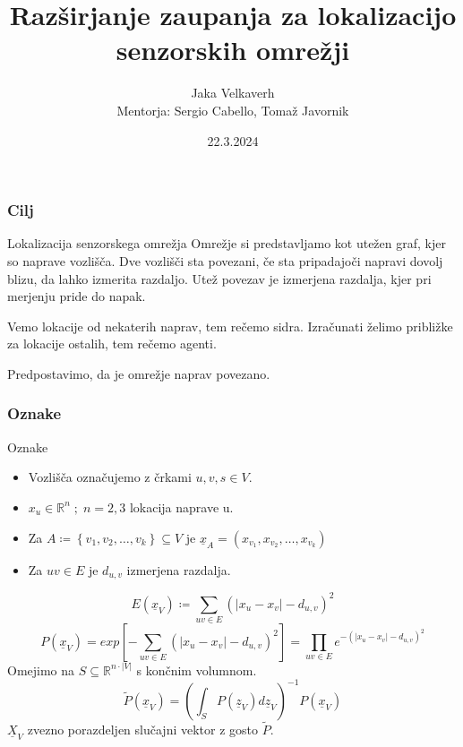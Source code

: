 \documentclass{beamer}
\title[Razširjanje zaupanja]{Razširjanje zaupanja za lokalizacijo senzorskih omrežji}
\author[Jaka Velkaverh]{Jaka Velkaverh\\Mentorja: Sergio Cabello, Tomaž Javornik}
\date{22.3.2024}
\renewcommand{\vec}{\underline}
\theoremstyle{definition}
\begin{document}
	\frame{\titlepage}

	\begin{frame}
		\frametitle{Cilj}
		\begin{block}{Lokalizacija senzorskega omrežja}
			Omrežje si predstavljamo kot utežen graf, kjer so naprave vozlišča.
			Dve vozlišči sta povezani, če sta pripadajoči napravi dovolj blizu,
			da lahko izmerita razdaljo. Utež povezav je izmerjena razdalja,
			kjer pri merjenju pride do napak.

			Vemo lokacije od nekaterih naprav, tem rečemo sidra. Izračunati
			želimo približke za lokacije ostalih, tem rečemo agenti.
		\end{block}
		Predpostavimo, da je omrežje naprav povezano.
	\end{frame}

	\begin{frame}
		\frametitle{Oznake}
		Oznake
		\begin{itemize}
			\item Vozlišča označujemo z črkami $u, v, s \in V$.
			\item $x_u \in \mathbb{R}^n\;;\;n=2, 3$ lokacija naprave u.
			\item Za $A \coloneqq \left\{v_1, v_2, \ldots, v_k\right\} \subseteq V$ je
				$\vec{x}_A = \left(x_{v_1}, x_{v_2}, \ldots, x_{v_k}\right)$
			\item Za $uv \in E$ je $d_{u,v}$ izmerjena razdalja.
		\end{itemize}
	\end{frame}

	\begin{frame}
		$$E\left(\vec{x}_V\right) \coloneqq \sum_{uv \in E}\left(\left|x_u - x_v\right|-d_{u,v}\right)^2$$
		\pause
		$$P\left(\vec{x}_V\right) = exp\left[-\sum_{uv \in E}\left(\left|x_u - x_v\right|-d_{u,v}\right)^2\right] =
		\prod_{uv \in E}e^{-\left(\left|x_u - x_v\right|-d_{u,v}\right)^2}$$
		\pause
		Omejimo na $S \subseteq \mathbb{R}^{n\cdot \left|V\right|}$ s končnim volumnom.
		$$\tilde{P}\left(\vec{x}_V\right) = \left(\int_S P\left(\vec{z}_V\right)d\vec{z}_V\right)^{-1}
		P\left(\vec{x}_V\right)$$
		\pause
		$\vec{X}_V$ zvezno porazdeljen slučajni vektor z gosto $\tilde{P}$.

	\end{frame}
\end{document}
